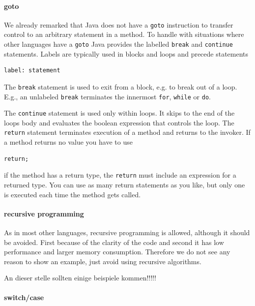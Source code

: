 \paragraph{goto}
We already remarked that Java does not have a \verb|goto| instruction
to transfer control to an arbitrary statement in a method. To handle
with situations where other languages have a \verb|goto| Java provides
the labelled \verb|break| and \verb|continue| statements. Labels are
typically used in blocks and loops and precede statements
\begin{verbatim}
label: statement
\end{verbatim}
The \verb|break| statement is used to exit from a block, e.g. to break
out of a loop. E.g., an unlabeled \verb|break| terminates the innermost
\verb|for|, \verb|while| or \verb|do|.

The \verb|continue| statement is used only within loops. It skips to
the end of the loops body and evaluates the boolean expression that
controls the loop. The \verb|return| statement terminates execution of
a method and returns to the invoker. If a method returns no value you
have to use
\begin{verbatim}
return;
\end{verbatim}
if the method has a return type, the \verb|return| must include an
expression for a returned type. You can use as many return statements 
as you like, but only one is executed each time the method gets called.

\paragraph{recursive programming}
As in most other languages, recursive programming is allowed, although
it should be avoided. First because of the clarity of the code
and second it has low performance and larger memory consumption. 
Therefore we do not see any reason to show an example, just
avoid using recursive algorithms.


An dieser stelle sollten einige beispiele kommen!!!!!

\paragraph{switch/case}


